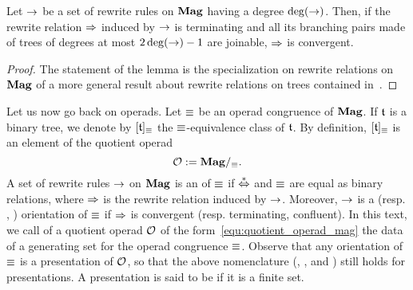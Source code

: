 \begin{Lemma} \label{lem:degree_confluence}
    Let $\operatorname{\to}$ be a set of rewrite rules on $\mathbf{Mag}$ having a degree
    $\mathrm{deg}(\operatorname{\to})$. Then, if the rewrite relation $\operatorname{\Rightarrow}$ induced by
    $\operatorname{\to}$ is terminating and all its branching pairs made of trees of
    degrees at most $2 \, \mathrm{deg}(\operatorname{\to}) - 1$ are joinable, $\operatorname{\Rightarrow}$ is
    convergent.
\end{Lemma}
\begin{proof}
    The statement of the lemma is the specialization on rewrite
    relations on $\mathbf{Mag}$ of a more general result about rewrite relations
    on trees contained in~\cite{Gir16}.
\end{proof}
\medbreak

Let us now go back on operads. Let $\operatorname{\equiv}$ be an operad congruence of
$\mathbf{Mag}$. If $\mathfrak{t}$ is a binary tree, we denote by $[\mathfrak{t}]_{\operatorname{\equiv}}$ the
$\operatorname{\equiv}$-equivalence class of $\mathfrak{t}$. By definition, $[\mathfrak{t}]_{\operatorname{\equiv}}$
is an element of the quotient operad
\begin{equation} \label{equ:quotient_operad_mag}
    \mathcal{O} := \mathbf{Mag}/_{\operatorname{\equiv}}.
\end{equation}
A set of rewrite rules $\operatorname{\to}$ on $\mathbf{Mag}$ is an  of
$\operatorname{\equiv}$ if $\operatorname{\overset{\ast}{\Leftrightarrow}}$ and $\operatorname{\equiv}$ are equal as binary relations,
where $\operatorname{\Rightarrow}$ is the rewrite relation induced by $\operatorname{\to}$. Moreover,
$\operatorname{\to}$ is a  (resp. , )
orientation of $\operatorname{\equiv}$ if $\operatorname{\Rightarrow}$ is convergent (resp.
terminating, confluent). In this text, we call  of a
quotient operad $\mathcal{O}$ of the form~\eqref{equ:quotient_operad_mag} the
data of a generating set for the operad congruence $\operatorname{\equiv}$. Observe
that any orientation of $\operatorname{\equiv}$ is a presentation of $\mathcal{O}$, so that
the above nomenclature (, , and
) still holds for presentations. A presentation is said
to be  if it is a finite set.
\medbreak

